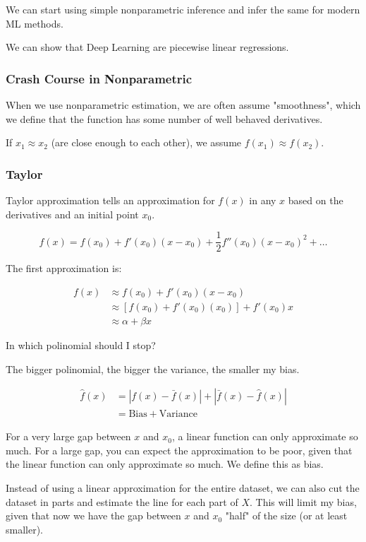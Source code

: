 \documentclass{article}
\begin{document}
We can start using simple nonparametric inference and infer the same for modern ML methods.

We can show that Deep Learning are piecewise linear regressions.

\subsubsection{Crash Course in Nonparametric}

When we use nonparametric estimation, we are often assume "smoothness", which we define that the function has some number of well behaved derivatives.

If $x_1 \approx x_2$ (are close enough to each other), we assume $f(x_1) \approx f(x_2)$.

\subsubsection{Taylor}

Taylor approximation tells an approximation for $f(x)$ in any $x$ based on the derivatives and an initial point $x_0$.

$$
f(x) = f(x_0) + f'(x_0)(x - x_0) + \frac{1}{2} f''(x_0)(x - x_0)^2 + \ldots
$$

The first approximation is:

\begin{align*}
    f(x) &\approx f(x_0) + f'(x_0)(x - x_0) \\
    &\approx \left[f(x_0) + f'(x_0)(x_0)\right] + f'(x_0)x \\
    &\approx \alpha + \beta x
\end{align*}

In which polinomial should I stop?

The bigger polinomial, the bigger the variance, the smaller my bias.

\begin{align*}
    \hat{f}(x) &= | f(x) - \bar{f}(x) | + | \bar{f}(x) - \hat{f}(x) |  \\
    &= \text{Bias} + \text{Variance}
\end{align*}

For a very large gap between $x$ and $x_0$, a linear function can only approximate so much. For a large gap, you can expect the approximation to be poor, given that the linear function can only approximate so much. We define this as bias.

Instead of using a linear approximation for the entire dataset, we can also cut the dataset in parts and estimate the line for each part of $X$. This will limit my bias, given that now we have the gap between $x$ and $x_0$ "half" of the size (or at least smaller).
\end{document}
